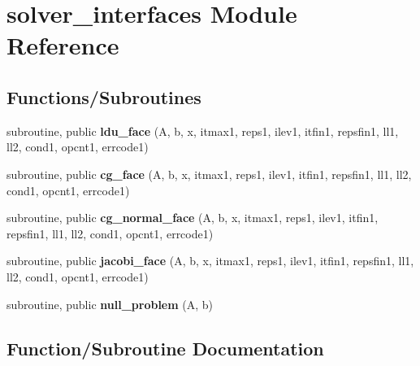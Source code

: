 \section{solver\+\_\+interfaces Module Reference}
\label{namespacesolver__interfaces}
\subsection*{Functions/\+Subroutines}
\begin{DoxyCompactItemize}
\item 
subroutine, public {\bf ldu\+\_\+face} (A, b, x, itmax1, reps1, ilev1, itfin1, repsfin1, ll1, ll2, cond1, opcnt1, errcode1)
\item 
subroutine, public {\bf cg\+\_\+face} (A, b, x, itmax1, reps1, ilev1, itfin1, repsfin1, ll1, ll2, cond1, opcnt1, errcode1)
\item 
subroutine, public {\bf cg\+\_\+normal\+\_\+face} (A, b, x, itmax1, reps1, ilev1, itfin1, repsfin1, ll1, ll2, cond1, opcnt1, errcode1)
\item 
subroutine, public {\bf jacobi\+\_\+face} (A, b, x, itmax1, reps1, ilev1, itfin1, repsfin1, ll1, ll2, cond1, opcnt1, errcode1)
\item 
subroutine, public {\bf null\+\_\+problem} (A, b)
\end{DoxyCompactItemize}


\subsection{Function/\+Subroutine Documentation}
